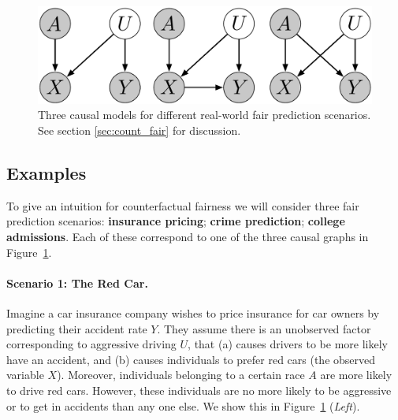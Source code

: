 
\begin{figure}[th]
\begin{center}
\vspace{-1.5ex}
\centerline{\includegraphics[width=\columnwidth]{simple_models_no_q3}}
\vspace{-2ex}
\caption{Three causal models for different real-world fair prediction scenarios.\label{figure.simple_models} See section \ref{sec:count_fair} for discussion.\vspace{-5ex}}
\vspace{-2ex}
\end{center}
\end{figure}

\subsection{Examples}
To give an intuition for counterfactual fairness we will consider three %
fair prediction scenarios: \textbf{insurance pricing}; \textbf{crime prediction}; \textbf{college admissions}. Each of these correspond to one of the three causal graphs in Figure~\ref{figure.simple_models}.%
%
\paragraph{Scenario 1: The Red Car.}
Imagine a car insurance company wishes to price insurance for car owners by
predicting their accident rate $Y$. They assume there is an
unobserved factor corresponding to aggressive driving $U$, that (a) causes
drivers to be more likely have an accident, and (b) causes individuals to prefer red cars (the observed
variable $X$). Moreover, individuals belonging to a
certain race $A$ are more likely to drive red cars. However, these individuals are no more likely to be aggressive or to get in accidents than any one else. We show this in Figure~\ref{figure.simple_models} (\emph{Left}).


